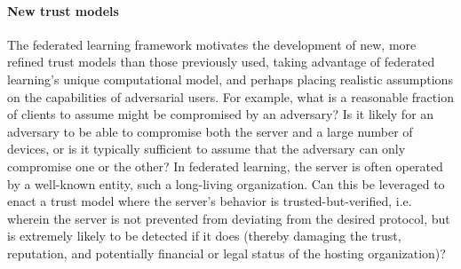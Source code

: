 \paragraph{New trust models} 
The federated learning framework motivates the development of new, more refined trust models than those previously used, taking advantage of federated learning's unique computational model, and perhaps placing realistic assumptions on the capabilities of adversarial users. 
For example, what is a reasonable fraction of clients to assume might be compromised by an adversary?  Is it likely for an adversary to be able to compromise both the server and a large number of devices, or is it typically sufficient to assume that the adversary can only compromise one or the other?  In federated learning, the server is often operated by a well-known entity, such a long-living organization.  Can this be leveraged to enact a trust model where the server's behavior is trusted-but-verified, i.e. wherein the server is not prevented from deviating from the desired protocol, but is extremely likely to be detected if it does (thereby damaging the trust, reputation, and potentially financial or legal status of the hosting organization)?



